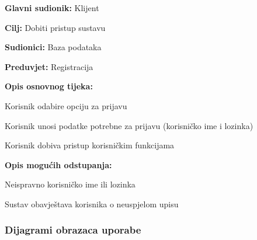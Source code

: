 				\noindent {}
				\begin{packed_item}
					
					\item \textbf{Glavni sudionik: } Klijent
					\item  \textbf{Cilj:} Dobiti pristup sustavu
					\item  \textbf{Sudionici:} Baza podataka
					\item  \textbf{Preduvjet:} Registracija
					\item  \textbf{Opis osnovnog tijeka:}
					
					\item[] \begin{packed_enum}
						
						\item Korisnik odabire opciju za prijavu
						\item Korisnik unosi podatke potrebne za prijavu (korisničko ime i lozinka)
						\item Korisnik dobiva pristup korisničkim funkcijama
					\end{packed_enum}
					
					\item  \textbf{Opis mogućih odstupanja:}
					
					\item[] \begin{packed_item}
						
						\item[2.a] Neispravno korisničko ime ili lozinka
						
						\item[] \begin{packed_enum}
							
							\item Sustav obavještava korisnika o neuspjelom upisu

							
							
						\end{packed_enum}
						
					\end{packed_item}
				\end{packed_item}
					
					
					
				
				
					
				\subsubsection{Dijagrami obrazaca uporabe}
					
